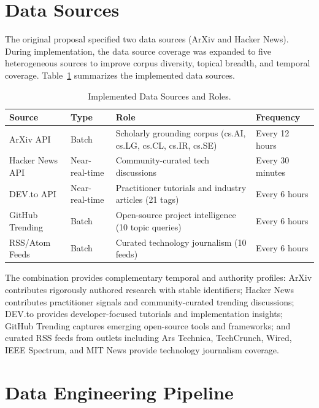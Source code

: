 \documentclass[12pt,a4paper]{report}
\begin{document}
\section{Data Sources}
\label{sec:data_sources}

The original proposal specified two data sources (ArXiv and Hacker News). During implementation, the data source coverage was expanded to five heterogeneous sources to improve corpus diversity, topical breadth, and temporal coverage. Table~\ref{tab:data_sources} summarizes the implemented data sources.

\begin{table}[H]
\caption{Implemented Data Sources and Roles.}
\label{tab:data_sources}
\centering
\begin{tabular}{p{3.0cm}p{2.5cm}p{4.5cm}p{2.5cm}}
\toprule
\textbf{Source} & \textbf{Type} & \textbf{Role} & \textbf{Frequency} \\
\midrule
ArXiv API & Batch & Scholarly grounding corpus (cs.AI, cs.LG, cs.CL, cs.IR, cs.SE) & Every 12 hours \\
Hacker News API & Near-real-time & Community-curated tech discussions & Every 30 minutes \\
DEV.to API & Near-real-time & Practitioner tutorials and industry articles (21 tags) & Every 6 hours \\
GitHub Trending & Batch & Open-source project intelligence (10 topic queries) & Every 6 hours \\
RSS/Atom Feeds & Batch & Curated technology journalism (10 feeds) & Every 6 hours \\
\bottomrule
\end{tabular}
\end{table}

The combination provides complementary temporal and authority profiles: ArXiv contributes rigorously authored research with stable identifiers; Hacker News contributes practitioner signals and community-curated trending discussions; DEV.to provides developer-focused tutorials and implementation insights; GitHub Trending captures emerging open-source tools and frameworks; and curated RSS feeds from outlets including Ars Technica, TechCrunch, Wired, IEEE Spectrum, and MIT News provide technology journalism coverage.

\section{Data Engineering Pipeline}
\label{sec:pipeline}
\end{document}
